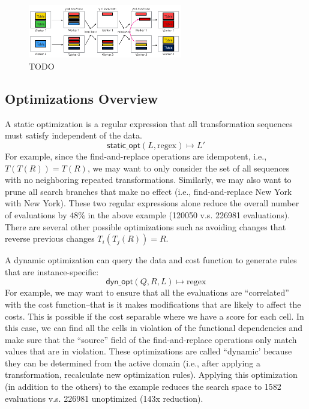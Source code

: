 \begin{figure}
    \centering
    \includegraphics[width=0.6\textwidth]{figures/distributed.png}
    \caption{TODO}
    \label{fig:my_label}
\end{figure}

\subsection{Optimizations Overview}

 A static optimization is a regular expression that all transformation sequences must satisfy independent of the data. 
\[\textsf{static\_opt}(L, \text{regex} ) \mapsto L'\]
For example, since the find-and-replace operations are idempotent, i.e., $T(T(R)) = T(R)$, we may want to only consider the set of all sequences with no neighboring repeated transformations. Similarly, we may also want to prune all search branches that make no effect (i.e., find-and-replace New York with New York).
These two regular expressions alone reduce the overall number of evaluations by $48\%$ in the above example (120050 v.s. 226981 evaluations).
There are several other possible optimizations  such as avoiding changes that reverse previous changes $T_i(T_j(R)) = R$.


 A dynamic optimization can query the data and cost function to generate rules that are instance-specific:
\[\textsf{dyn\_opt}(Q, R, L) \mapsto \text{regex}\]
For example, we may want to ensure that all the evaluations are ``correlated'' with the cost function--that is it makes modifications that are likely to affect the costs.
This is possible if the cost separable where we have a score for each cell. In this case, we can find all the cells in violation of the functional dependencies and make sure that the ``source'' field of the find-and-replace operations only match values that are in violation.
These optimizations are called ``dynamic' because they can be determined from the active domain (i.e., after applying a transformation, recalculate new optimization rules).
Applying this optimization (in addition to the others) to the example reduces the search space to 1582 evaluations v.s. 226981 unoptimized (143x reduction).

